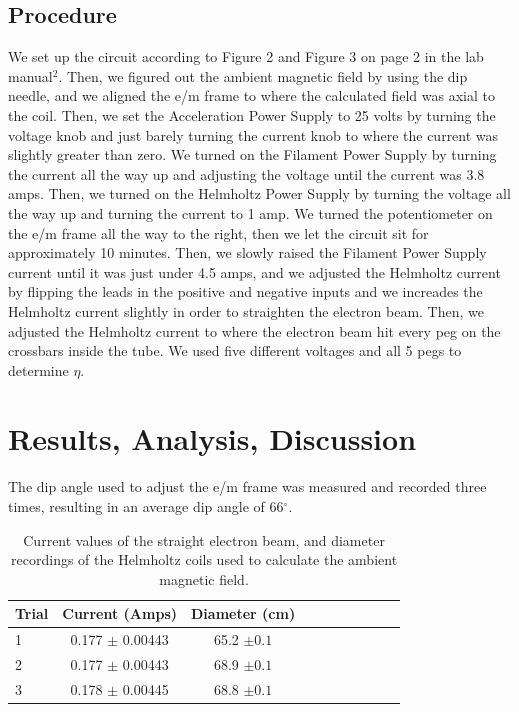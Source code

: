 \documentclass[twoside,10pt]{article}
\begin{document}
\begin{multicols}{2}
		\subsection*{Procedure}

		We set up the circuit according to Figure 2 and Figure 3 on page 2 in the lab manual$^2$. Then, we figured out the ambient magnetic field by using the dip needle, and we aligned the e/m frame to where the calculated field was axial to the coil. Then, we set the Acceleration Power Supply to 25 volts by turning the voltage knob and just barely turning the current knob to where the current was slightly greater than zero. We turned on the Filament Power Supply by turning the current all the way up and adjusting the voltage until the current was 3.8 amps. Then, we turned on the Helmholtz Power Supply by turning the voltage all the way up and turning the current to 1 amp. We turned the potentiometer on the e/m frame all the way to the right, then we let the circuit sit for approximately 10 minutes. Then, we slowly raised the Filament Power Supply current until it was just under 4.5 amps, and we adjusted the Helmholtz current by flipping the leads in the positive and negative inputs and we increades the Helmholtz current slightly in order to straighten the electron beam. Then, we adjusted the Helmholtz current to where the electron beam hit every peg on the crossbars inside the tube. We used five different voltages and all 5 pegs to determine $\eta$.
		
		\section{Results, Analysis, Discussion}
		
		The dip angle used to adjust the e/m frame was measured and recorded three times, resulting in an average dip angle of 66$^\circ$.
		
		\begin{table}[H]
			\centering
			\small
			\caption{Current values of the straight electron beam, and diameter recordings of the Helmholtz coils used to calculate the ambient magnetic field.}
			\begin{tabular}{l c c rrrrrrr}
			\toprule				
			 Trial &  Current (Amps) &  Diameter (cm)\\ [1ex]
			\midrule
			1	 & 0.177 $\pm$ 0.00443 & 65.2 $\pm 0.1$\\ [1.5ex]
			2	& 0.177 $\pm$ 0.00443 & 68.9 $\pm 0.1$ \\ [1.5ex]
			3	& 0.178 $\pm$ 0.00445 & 68.8 $\pm 0.1$\\ [1.5ex]
			\bottomrule
		\end{tabular}
		\end{table}


\end{multicols}
\end{document}
